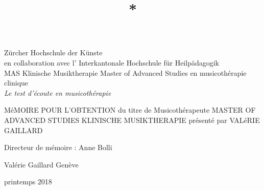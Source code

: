 \documentclass[12pt,french]{report}
\begin{document}
\title{{*}}

\maketitle
\begin{titlepage}
 \begin{center}
    \Large
     Zürcher Hochschule der Künste\\
 	en collaboration avec l' Interkantonale Hochschule für Heilpädagogik \\
	 MAS Klinische Musiktherapie Master of Advanced Studies en musicothérapie clinique\\
  \vfill
  { \LARGE
\emph{Le test d'écoute en musicothérapie }\\ \bigskip
	 }
 \vfill
 \end{center}
MéMOIRE  POUR L'OBTENTION  du titre de
Musicothérapeute
MASTER OF ADVANCED STUDIES KLINISCHE MUSIKTHERAPIE présenté par VALéRIE GAILLARD

Directeur de mémoire : Anne Bolli

 {\large

	 Valérie Gaillard    \hfill Genève\\
	 \rule{0mm}{1pt} \hfill printemps 2018}

\end{titlepage}
\end{document}

